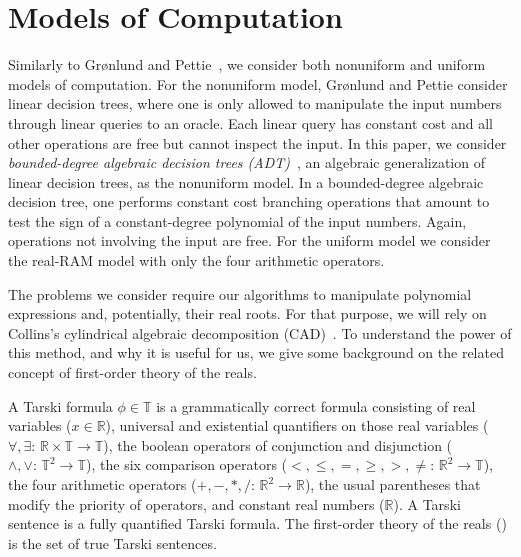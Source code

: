\section{Models of Computation}

Similarly to Gr\o nlund and Pettie~\cite{GP14}, we consider both nonuniform
and uniform models of computation.
%
For the nonuniform model, Gr\o nlund and Pettie consider linear
decision trees, where one is only allowed to manipulate the input numbers
through linear queries to an oracle. Each linear query has constant cost and
all other operations are free but cannot inspect the input.
%
In this paper, we consider
\emph{bounded-degree algebraic decision trees (ADT)}~\cite{R72,Y81,SY82},
an algebraic generalization of linear decision trees,
as the nonuniform model. In a bounded-degree algebraic decision tree, one
performs constant cost branching operations that amount to test the sign of
a constant-degree polynomial of the input numbers. Again,
operations not involving the input are free.
%
For the uniform model we consider the real-RAM model with only the four
arithmetic operators.


The problems we consider require our algorithms to manipulate polynomial
expressions and, potentially, their real roots. For that purpose, we will rely
on Collins's cylindrical algebraic decomposition (CAD)~\cite{C75}.
%
To understand the power of this method, and why it is useful for us, we give some
background on the related concept of first-order theory of the reals.

\begin{definition}
	A Tarski formula $\phi \in \mathbb{T}$ is a grammatically correct formula
	consisting of real variables ($x \in \mathbb{R}$), universal and
	existential quantifiers on those real variables
	($\forall,\exists\colon\,\mathbb{R}\times\mathbb{T}\to\mathbb{T}$), the
	boolean operators of conjunction and disjunction
	($\land,\lor\colon\,\mathbb{T}^2\to\mathbb{T}$), the six comparison
	operators ($<,\le,=,\ge,>,\ne\colon\,\mathbb{R}^2\to\mathbb{T}$), the four
	arithmetic operators ($+,-,*,/\colon\,\mathbb{R}^2\to\mathbb{R}$), the
	usual parentheses that modify the priority of operators, and constant real
	numbers (\(\mathbb{R}\)).
	A Tarski sentence is a fully quantified Tarski formula.
	The first-order theory of the reals (\FOTR{}) is
	the set of true Tarski sentences.
\end{definition}

